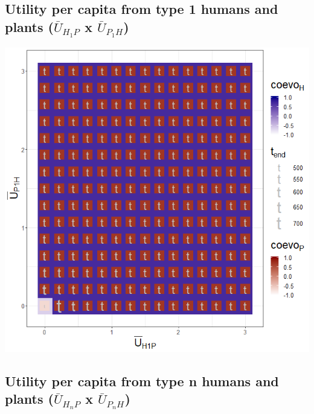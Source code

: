 \documentclass[]{book}
\begin{document}
\newpage

\hypertarget{utility-per-capita-from-type-1-humans-and-plants-baru_h_1p-x-baru_p_1h}{%
\subsection{\texorpdfstring{Utility per capita from type 1 humans and plants (\(\bar{U}_{H_{1}P}\) x \(\bar{U}_{P_{1}H}\))}{Utility per capita from type 1 humans and plants (\textbackslash{}bar\{U\}\_\{H\_\{1\}P\} x \textbackslash{}bar\{U\}\_\{P\_\{1\}H\})}}\label{utility-per-capita-from-type-1-humans-and-plants-baru_h_1p-x-baru_p_1h}}


\includegraphics[width=1\linewidth]{plots/3_twoPar-mU.H1P-mU.P1H_plot}

\newpage

\hypertarget{utility-per-capita-from-type-n-humans-and-plants-baru_h_np-x-baru_p_nh-1}{%
\subsection{\texorpdfstring{Utility per capita from type n humans and plants (\(\bar{U}_{H_{n}P}\) x \(\bar{U}_{P_{n}H}\))}{Utility per capita from type n humans and plants (\textbackslash{}bar\{U\}\_\{H\_\{n\}P\} x \textbackslash{}bar\{U\}\_\{P\_\{n\}H\})}}\label{utility-per-capita-from-type-n-humans-and-plants-baru_h_np-x-baru_p_nh-1}}
\end{document}

